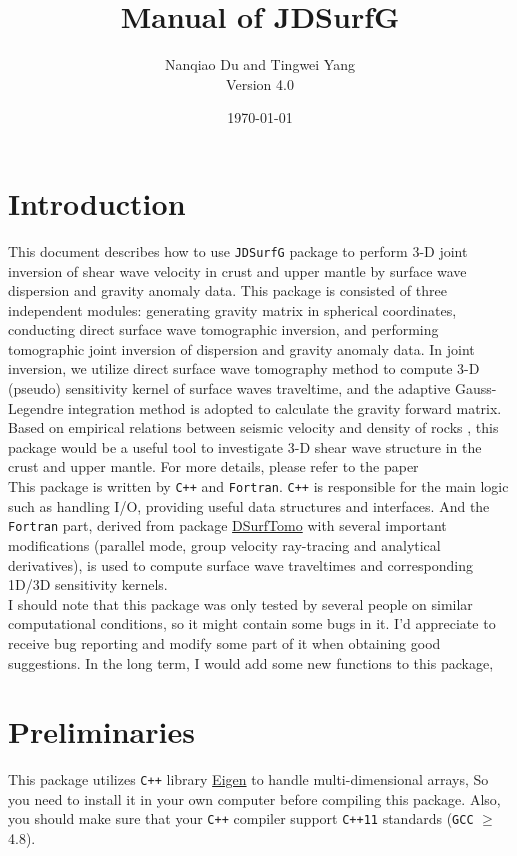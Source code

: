 \documentclass[UTF8]{article}
\title{\textbf{Manual of JDSurfG}}
\author{Nanqiao Du and Tingwei Yang \\ Version 4.0}
\date{\today}
\begin{document}
\maketitle
\tableofcontents
\newpage


\section{Introduction}
This document describes how to use \texttt{JDSurfG} package 
to perform 3-D joint inversion of shear wave velocity
in crust and upper mantle by surface wave dispersion and
gravity anomaly data. This package is consisted of three
independent modules: generating gravity matrix in spherical
coordinates, conducting direct surface wave tomographic 
inversion, and performing tomographic joint inversion of 
dispersion and gravity anomaly data. In joint inversion, we
utilize direct surface wave tomography method \citep{Fang2015}
to compute 3-D (pseudo) sensitivity kernel of surface waves
traveltime, and the adaptive Gauss-Legendre integration 
method \citep{RN35} is adopted to calculate the gravity 
forward matrix. Based on empirical relations between seismic
velocity and density of rocks \citep{Brocher05}, this 
package would be a useful tool to investigate 3-D shear 
wave structure in the crust and upper mantle. For more details, 
please refer to the paper \citep{Du2021} \\

This package is written by \texttt{C++} and \texttt{Fortran}.
\texttt{C++} is responsible for the main logic such as 
handling I/O, providing useful data structures and 
interfaces. And the \texttt{Fortran} part, derived from 
package \href{https://github.com/HongjianFang/DSurfTomo/tree/stable/src}{DSurfTomo}
with several important modifications (parallel mode, group velocity ray-tracing and analytical derivatives), is used to 
compute surface wave traveltimes and corresponding 1D/3D 
sensitivity kernels.\\

I should note that this package was only tested by 
several people on similar computational conditions, 
so it might contain some bugs in it. I'd appreciate 
to receive bug reporting and modify some part of 
it when obtaining good suggestions. In the long term, 
I would add some new functions to this package, 

\section{Preliminaries}
This package utilizes \texttt{C++} library \href{http://eigen.tuxfamily.org/index.php?title=Main_Page}{Eigen}
to handle multi-dimensional arrays, So you need 
to install it in your own computer before
compiling this package. Also, you should make sure
that your \texttt{C++} compiler support \texttt{C++11}
standards (\texttt{GCC} $\geq$ 4.8).
\end{document}
